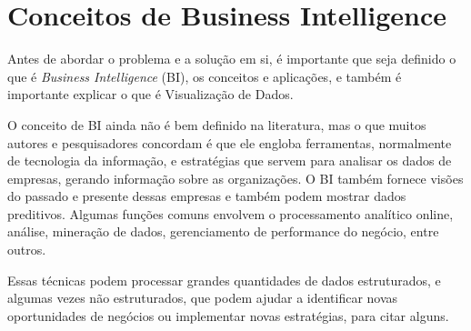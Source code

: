 \chapter{Conceitos de Business Intelligence}\label{cap_trabalho_academico}


Antes de abordar o problema e a solução em si, é importante que seja definido o que é \textit{Business Intelligence} (BI), os conceitos e aplicações, e também é importante explicar o que é Visualização de Dados. 

O conceito de BI ainda não é bem definido na literatura, mas o que muitos autores e pesquisadores concordam é que ele engloba ferramentas, normalmente de tecnologia da informação, e estratégias que servem para analisar os dados de empresas, gerando informação sobre as organizações. O BI também fornece visões do passado e presente dessas empresas e também podem mostrar dados preditivos. Algumas funções comuns envolvem o processamento analítico online, análise, mineração de dados, gerenciamento de performance do negócio, entre outros. 

Essas técnicas podem processar grandes quantidades de dados estruturados, e algumas vezes não estruturados, que podem ajudar a identificar novas oportunidades de negócios ou implementar novas estratégias, para citar alguns. 